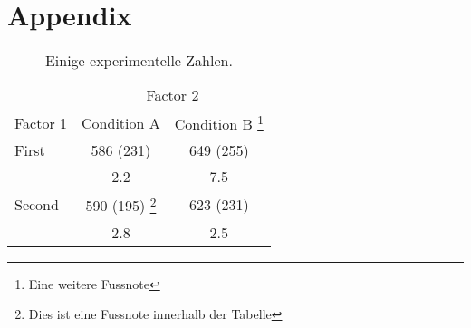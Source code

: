 \section*{Appendix}
\begin{table}[htb]
\begin{minipage}{\linewidth}
\renewcommand{\footnoterule}{}
\renewcommand{\thefootnote}{\alph{footnote}}
\caption{Einige experimentelle Zahlen.}
\label{tab:tab1}
\centering
\begin{tabular}{lcc}
\toprule
          & \multicolumn{2}{c}{Factor 2} \\ 
          	\cmidrule{2-3}
Factor 1  & Condition A  & Condition B \footnote{Eine weitere Fussnote}  \\ 
\midrule
First     & 586 (231)    & 649 (255)     \\
          &    2.2       &    7.5        \\
Second    & 590 (195) \footnote{Dies ist eine Fussnote innerhalb der Tabelle}   & 623 (231)     \\
          &    2.8       &    2.5        \\ 
\bottomrule
\end{tabular}
\end{minipage}
\end{table}